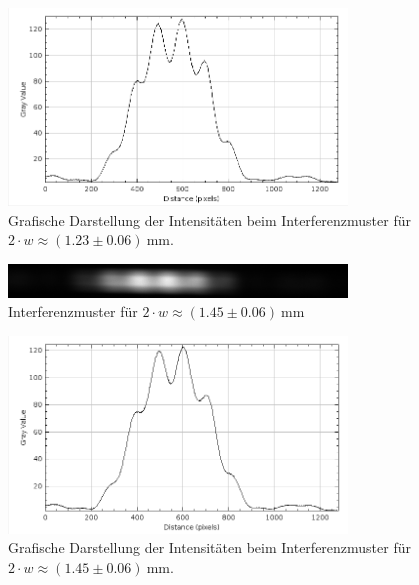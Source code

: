 \documentclass{article}
\begin{document}
\begin{figure}[H]
\centering
\caption{Grafische Darstellung der Intensitäten beim Interferenzmuster für $2\cdot w \approx (1.23\pm0.06)~$mm.}
\includegraphics[width=9cm]{moodle/img6_graph.png}
\end{figure}





\begin{figure}[H]
\centering
\caption{Interferenzmuster für $2\cdot w \approx (1.45\pm0.06)~$mm}
\includegraphics[width=9cm]{moodle/img7.png}
\end{figure}

\begin{figure}[H]
\centering
\caption{Grafische Darstellung der Intensitäten beim Interferenzmuster für $2\cdot w \approx (1.45\pm0.06)~$mm.}
\includegraphics[width=9cm]{moodle/img7_graph.png}
\end{figure}
\end{document}
